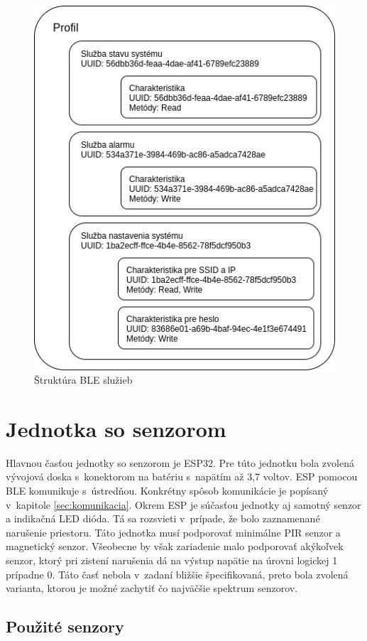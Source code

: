 \begin{figure}[ht]
    \centering
    \includegraphics[scale=0.5]{obrazky-figures/BLE_structure.png}
    \caption{Štruktúra BLE služieb}
    \label{fig:BLE_structure}
\end{figure}

\section{Jednotka so senzorom}

Hlavnou časťou jednotky so senzorom je ESP32. Pre túto jednotku bola zvolená vývojová doska s~konektorom na batériu s~napätím až 3,7 voltov. ESP pomocou BLE komunikuje s~ústredňou. Konkrétny spôsob komunikácie je popísaný v~kapitole \ref{sec:komunikacia}. Okrem ESP je súčasťou jednotky aj samotný senzor a indikačná LED dióda. Tá sa rozsvieti v~prípade, že bolo zaznamenané narušenie priestoru. Táto jednotka musí podporovať minimálne PIR senzor a magnetický senzor. Všeobecne by však zariadenie malo podporovať akýkoľvek senzor, ktorý pri zistení narušenia dá na výstup napätie na úrovni logickej 1 prípadne 0. Táto časť nebola v~zadaní bližšie špecifikovaná, preto bola zvolená varianta, ktorou je možné zachytiť čo najväčšie spektrum senzorov.

\subsection{Použité senzory}

